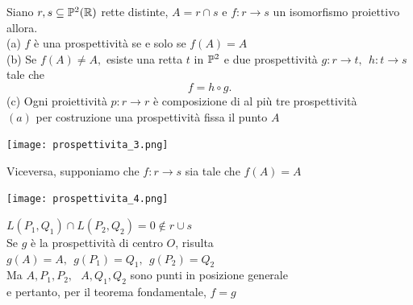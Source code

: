 \documentclass[12px]{article}
\begin{document}
Siano $r,s\subseteq\mathbb{P}^2(\mathbb{R})$ rette distinte, $A=r\cap s$ e $f:r \rightarrow s$ un isomorfismo proiettivo allora.\\
(a) $f$ è una prospettività se e solo se $f(A) = A$\\
(b) Se  $f(A)\neq A , $ esiste una retta $t$ in $\mathbb{P}^2$ e due prospettività $g: r \rightarrow t, \ \ h : t \rightarrow s$ tale che
\[
 f = h\circ g
.\] 
(c) Ogni proiettività $p:r \rightarrow r$ è composizione di al più tre prospettività
\\
$(a)$ per costruzione una prospettività fissa il punto $A$\\
\begin{center}
\texttt{[image: prospettivita\_3.png]}
\end{center}
 Viceversa, supponiamo che $f:r \rightarrow s$ sia tale che $f(A) = A$ 
\begin{center}
\texttt{[image: prospettivita\_4.png]}
\end{center}
 $L(P_1,Q_1)\cap L(P_2,Q_2) = 0 \not \in r\cup s$\\
 Se $g$ è la prospettività di centro $O$, risulta $g(A) = A,\ \  g(P_1)=Q_1, \ \ g(P_2)=Q_2$\\
 Ma $A,P_1,P_2, \ \ \ A,Q_1,Q_2$ sono punti in posizione generale\\
 e pertanto, per il teorema fondamentale, $f=g$
\end{document}
